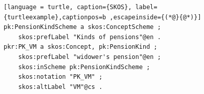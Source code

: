 
\begin{figure}[h]
\begin{lstlisting}[language = turtle, caption={SKOS}, label={turtleexample},captionpos=b ,escapeinside={(*@}{@*)}]
pk:PensionKindScheme a skos:ConceptScheme ; 
    skos:prefLabel "Kinds of pensions"@en .
pkr:PK_VM a skos:Concept, pk:PensionKind ;
    skos:prefLabel "widower's pension"@en ;
    skos:inScheme pk:PensionKindScheme ;
    skos:notation "PK_VM" ;
    skos:altLabel "VM"@cs .
\end{lstlisting}
\end{figure}

